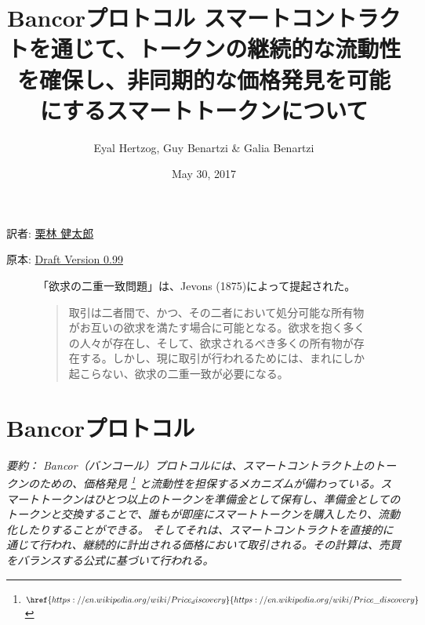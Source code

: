 \documentclass{jsarticle}
\begin{document}
\title{
  \textbf{Bancorプロトコル}
  \protect\linebreak
  \protect\linebreak
  \large
  スマートコントラクトを通じて、トークンの継続的な流動性を確保し、非同期的な価格発見を可能にするスマートトークンについて
}

\author{Eyal Hertzog, Guy Benartzi \& Galia Benartzi}
\date{May 30, 2017}

\maketitle

\begin{center}
  \item[訳者:] \href{https://kentarok.org}{栗林 健太郎}
  \item[原本:] \href{http://www.hyuki.com/girl/}{Draft Version 0.99}
\end{center}

\begin{figure}[b]
  「欲求の二重一致問題」は、Jevons (1875)によって提起された。

  \begin{quotation}  
    取引は二者間で、かつ、その二者において処分可能な所有物がお互いの欲求を満たす場合に可能となる。欲求を抱く多くの人々が存在し、そして、欲求されるべき多くの所有物が存在する。しかし、現に取引が行われるためには、まれにしか起こらない、欲求の二重一致が必要になる。
  \end{quotation}
\end{figure}

\newpage
\tableofcontents
\newpage

\section{Bancorプロトコル}

\emph{
  要約： Bancor（バンコール）プロトコルには、スマートコントラクト上のトークンのための、価格発見
  \footnote{
    $\href{
      https://en.wikipedia.org/wiki/Price_discovery
    }{
      https://en.wikipedia.org/wiki/Price\_discovery
    }$
  }
  と流動性を担保するメカニズムが備わっている。スマートトークンはひとつ以上のトークンを準備金として保有し、準備金としてのトークンと交換することで、誰もが即座にスマートトークンを購入したり、流動化したりすることができる。 そしてそれは、スマートコントラクトを直接的に通じて行われ、継続的に計出される価格において取引される。その計算は、売買をバランスする公式に基づいて行われる。
} \\
\end{document}
